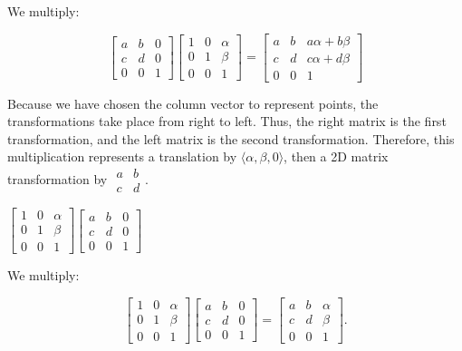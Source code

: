 \documentclass[../key.tex]{subfiles}
\begin{document}
We multiply:

$$\begin{bmatrix} a & b & 0 \\ c & d & 0 \\ 0 & 0 & 1 \end{bmatrix} \begin{bmatrix} 1 & 0 & \alpha \\ 0 & 1 & \beta \\ 0 & 0 & 1 \end{bmatrix} = \begin{bmatrix} a & b & a\alpha + b\beta \\ c & d & c\alpha + d\beta \\ 0 & 0 & 1 \end{bmatrix}$$

Because we have chosen the column vector to represent points, the transformations take place from right to left. Thus, the right matrix is the first transformation, and the left matrix is the second transformation. Therefore, this multiplication represents a translation by $\langle\alpha,\beta,0\rangle$, then a 2D matrix transformation by $\begin{smallmatrix} a & b \\ c & d \end{smallmatrix}$.

\begin{inner_problem}
\item $\left[\begin{array}{ccc} 1 & 0 & \alpha \\ 0 & 1 & \beta \\ 0 & 0 & 1 \end{array}\right]\left[\begin{array}{ccc}a & b & 0 \\ c & d & 0 \\ 0 & 0 & 1 \end{array}\right]$
\end{inner_problem}

We multiply:

$$\begin{bmatrix} 1 & 0 & \alpha \\ 0 & 1 & \beta \\ 0 & 0 & 1 \end{bmatrix} \begin{bmatrix} a & b & 0 \\ c & d & 0 \\ 0 & 0 & 1 \end{bmatrix} = \begin{bmatrix}
a & b & \alpha \\ c & d & \beta \\ 0 & 0 & 1 \end{bmatrix}.$$
\end{document}
